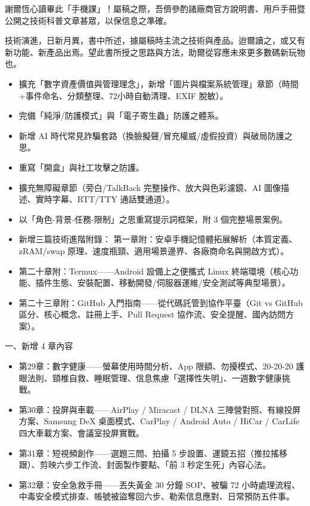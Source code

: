 
謝爾恆心讀畢此「手機課」！屬稿之際，吾儕參酌諸廠商官方說明書、用戶手冊暨公開之技術科普文章甚眾，以保信息之準確。

技術演進，日新月異，書中所述，據屬稿時主流之技術與產品。迨爾讀之，或又有新功能、新產品出焉。望此書所授之思路與方法，助爾從容應未來更多數碼新玩物也。


\begin{itemize}
  \item 擴充「數字資產價值與管理理念」，新增「圖片與檔案系統管理」章節（時間+事件命名、分類整理、72小時自動清理、EXIF 脫敏）。
  \item 完備「純淨/防護模式」與「電子寄生蟲」防護之體系。
  \item 新增 AI 時代常見詐騙套路（換臉擬聲/冒充權威/虛假投資）與破局防護之思。
  \item 重寫「開盒」與社工攻擊之防護。
  \item 擴充無障礙章節（旁白/TalkBack 完整操作、放大與色彩濾鏡、AI 圖像描述、實時字幕、RTT/TTY 通話雙通道）。
  \item 以「角色-背景-任務-限制」之思重寫提示詞框架，附 3 個完整場景案例。
  \item 新增三篇技術進階附錄： 第一章附：安卓手機記憶體拓展解析（本質定義、zRAM/swap 原理、速度瓶頸、適用場景邊界、各廠商命名與開啟方式）。
  \item 第二十章附：Termux——Android 設備上之便攜式 Linux 終端環境（核心功能、插件生態、安裝配置、移動開發/伺服器運維/安全測試等典型場景）。
  \item 第二十三章附：GitHub 入門指南——從代碼託管到協作平臺（Git vs GitHub 區分、核心概念、註冊上手、Pull Request 協作流、安全提醒、國內訪問方案）。
\end{itemize}


一、新增 4 章內容

\begin{itemize}
  \item 第29章：數字健康——螢幕使用時間分析、App 限額、勿擾模式、20-20-20 護眼法則、頸椎自救、睡眠管理、信息焦慮「選擇性失明」、一週數字健康挑戰。
  \item 第30章：投屏與車載——AirPlay / Miracast / DLNA 三陣營對照、有線投屏方案、Samsung DeX 桌面模式、CarPlay / Android Auto / HiCar / CarLife 四大車載方案、會議室投屏實戰。
  \item 第31章：短視頻創作——選題三問、拍攝 5 步設置、運鏡五招（推拉搖移跟）、剪映六步工作流、封面製作要點、「前 3 秒定生死」內容心法。
  \item 第32章：安全急救手冊——丟失黃金 30 分鐘 SOP、被騙 72 小時處理流程、中毒安全模式排查、帳號被盜奪回六步、勒索信息應對、日常預防五件事。
\end{itemize}

